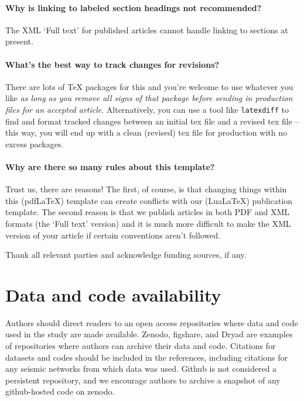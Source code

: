 \documentclass[]{seismica}
\begin{document}
    \paragraph{Why is linking to labeled section headings not recommended?} The XML `Full text' for published articles cannot handle linking to sections at present.

    \paragraph{What's the best way to track changes for revisions?} There are lots of TeX packages for this and you're welcome to use whatever you like \textit{as long as you remove all signs of that package before sending in production files for an accepted article}. Alternatively, you can use a tool like \texttt{latexdiff} to find and format tracked changes between an initial tex file and a revised tex file -- this way, you will end up with a clean (revised) tex file for production with no excess packages.

    \paragraph{Why are there so many rules about this template?} Trust us, there are reasons! The first, of course, is that changing things within this (pdfLaTeX) template can create conflicts with our (LuaLaTeX) publication template. The second reason is that we publish articles in both PDF and XML formats (the `Full text' version) and it is much more difficult to make the XML version of your article if certain conventions aren't followed.
		
		\begin{acknowledgements}
			Thank all relevant parties and acknowledge funding sources, if any.
		\end{acknowledgements}
		
		\section*{Data and code availability}
		Authors should direct readers to an open access repositories where data and code used in the study are made available. Zenodo, figshare, and Dryad are examples of repositories where authors can archive their data and code. Citations for datasets and codes should be included in the references, including citations for any seismic networks from which data was used. Github is not considered a persistent repository, and we encourage authors to archive a snapshot of any github-hosted code on zenodo.
		
\end{document}
